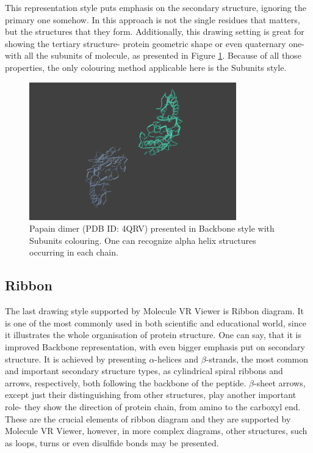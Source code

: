This representation style puts emphasis on the secondary structure, ignoring the primary one somehow. In this approach is not the single residues that matters, but the structures that they form. Additionally, this drawing setting is great for showing the tertiary structure- protein geometric shape or even quaternary one- with all the subunits of molecule, as presented in Figure \ref{fig:backbone}. Because of all those properties, the only colouring method applicable here is the Subunits style.

\begin{figure}[!htb]
\centering    
\includegraphics[width=0.8\textwidth]{Figs/backbone.png}
\caption{Papain dimer (PDB ID: 4QRV) presented in Backbone style with Subunits colouring. One can recognize alpha helix structures occurring in each chain.}
\label{fig:backbone} 
\end{figure}

\subsection{Ribbon}

The last drawing style supported by Molecule VR Viewer is Ribbon diagram. It is one of the most commonly used in both scientific and educational world, since it illustrates the whole organisation of protein structure. One can say, that it is improved Backbone representation, with even bigger emphasis put on secondary structure. It is achieved by presenting $\alpha$-helices and $\beta$-strands, the most common and important secondary structure types, as cylindrical spiral ribbons and arrows, respectively, both following the backbone of the peptide. $\beta$-sheet arrows, except just their distinguishing from other structures, play another important role- they show the direction of protein chain, from amino to the carboxyl end. These are the crucial elements of ribbon diagram and they are supported by Molecule VR Viewer, however, in more complex diagrams, other structures, such as loops, turns or even disulfide bonds may be presented. 

